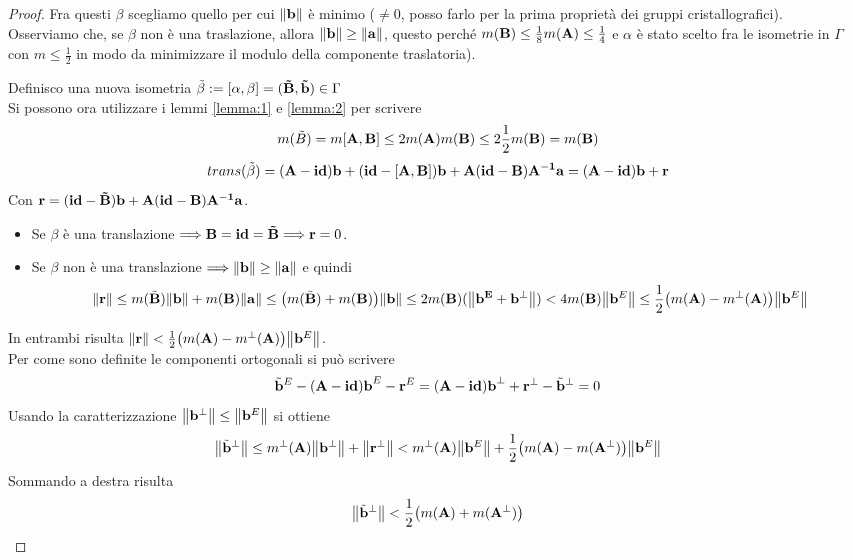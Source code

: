 \documentclass[a4paper]{book}
\begin{document}
\begin{proof}
Fra questi $\beta$ scegliamo quello per cui $\norm{\vb{b}}$ è minimo ($\neq 0$, posso farlo per la prima proprietà dei gruppi cristallografici). \\
Osserviamo che, se $\beta$ non è una traslazione, allora $ \norm{\vb{b}} \geq \norm{\vb{a}}$, questo perché $m(\vb{B}) \leq \frac{1}{8}m(\vb{A}) \leq \frac{1}{4}$ e $\alpha$ è stato scelto fra le isometrie in $\Gamma$ con $m \leq \frac{1}{2}$ in modo da minimizzare il modulo della componente traslatoria).  





Definisco una nuova isometria $ \tilde{\beta} := [\vb{\alpha,\beta}] = (\vb{\tilde{B}, \tilde{b}})\in \Gamma$  \\
Si possono ora utilizzare i lemmi \ref{lemma:1} e \ref{lemma:2} per scrivere 
\[ m(\tilde{B} ) = m[\vb{A,B}] \leq 2m(\vb{A}) m(\vb{B}) \leq 2 \frac{1}{2}m(\vb{B}) = m(\vb{B}) \]
\[ trans( \tilde{\beta}) = \vb{(A-id)b + (id-[A,B])b + A(id-B)A^{-1}a} = \vb{(A-id)b + r}\]
Con $\vb{r} = \vb{(id-\tilde{B})b + A(id-B)A^{-1}a}$.
\begin{itemize}
\item Se $\beta$  è una translazione $\Longrightarrow \vb{B = id = \tilde{B}} \Longrightarrow \vb{r} = 0$. 
\item Se $\beta$ non è una translazione $\Longrightarrow \norm{\vb{b}} \geq \norm{\vb{a}}$  e quindi \\
\[ \norm{\vb{r}} \leq m(\tilde{\vb{B}}) \norm{\vb{b}} + m(\vb{B}) \norm{\vb{a}} \leq \big( m(\tilde{\vb{B}}) + m(\vb{B}) \big) \norm{\vb{b}} \leq 2m(\vb{B})(\norm{\vb{b^{E}+ b^{\perp}}}) < 4 m(\vb{B}) \norm{\vb{b}^{E}} \leq \frac{1}{2} \big( m(\vb{A}) - m^{\perp}(\vb{A}) \big)\norm{\vb{b}^{E}} \]
\end{itemize}
In entrambi risulta $\norm{\vb{r}} < \frac{1}{2} \big( m(\vb{A}) - m^{\perp}(\vb{A}) \big)\norm{\vb{b}^{E}}$. \\
Per come sono definite le componenti ortogonali si può scrivere
\[ \tilde{\vb{b}}^{E} -(\vb{A-id) b}^{E} - \vb{r}^{E} = (\vb{A-id) b}^{\perp} + \vb{r}^{\perp} - \tilde{\vb{b}}^{\perp} = 0 \]
Usando la caratterizzazione $\norm{\vb{b}^{\perp}} \leq \norm{\vb{b}^E}$ si ottiene
\[ \norm{\tilde{\vb{b}}^{\perp}} \leq  m^{\perp}(\vb{A}) \norm{\vb{b}^{\perp}} + \norm{\vb{r}^{\perp}} < m^{\perp}(\vb{A}) \norm{\vb{b}^{E}} + \frac{1}{2} \big( m(\vb{A}) - m(\vb{A}^{\perp}) \big)\norm{\vb{b}^{E}}  \] 
Sommando a destra risulta
\[ \norm{\tilde{\vb{b}}^{\perp}} < \frac{1}{2} \big( m(\vb{A}) + m(\vb{A}^{\perp}) \big) \]

\end{proof}
\end{document}
